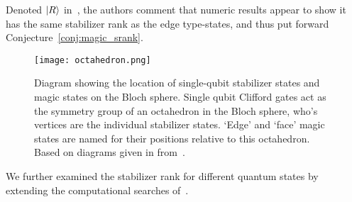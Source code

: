 Denoted $\ket{R}$ in~\cite{Bravyi2015}, the authors comment that numeric results appear to show it has the same stabilizer rank as the edge type-states, and thus put forward Conjecture~\ref{conj:magic_srank}.
\begin{figure}[H]
\centering
\texttt{[image: octahedron.png]}
\caption{Diagram showing the location of single-qubit stabilizer states and magic states on the Bloch sphere. Single qubit Clifford gates act as the symmetry group of an octahedron in the Bloch sphere, who's vertices are the individual stabilizer states. `Edge' and `face' magic states are named for their positions relative to this octahedron. Based on diagrams given in from~\cite{Bravyi2005}.}
\end{figure}
We further examined the stabilizer rank for different quantum states by extending the computational searches of~\cite{Bravyi2015}.

